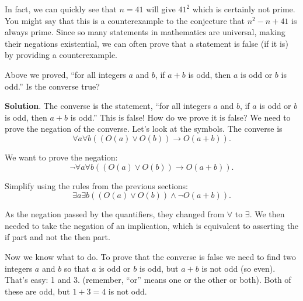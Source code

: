 \documentclass[11pt,]{book}
\theoremstyle{ptxplainnotitle}
\theoremstyle{ptxplaintitle}
\theoremstyle{ptxdefinitionnotitle}
\theoremstyle{ptxdefinitiontitle}
\theoremstyle{ptxdefinitionnotitle}
\theoremstyle{ptxdefinitiontitle}
\theoremstyle{ptxdefinitionnotitle}
\theoremstyle{ptxdefinitiontitle}
\theoremstyle{ptxdefinitiontitlenonumber}
\theoremstyle{ptxdefinitiontitlenonumber}
\numberwithin{equation}{chapter}
\newcommand{\imp}{\rightarrow}
\begin{document}
\par
\hypertarget{p-2440}{}%
In fact, we can quickly see that \(n = 41\) will give \(41^2\) which is certainly not prime. You might say that this is a counterexample to the conjecture that \(n^2 - n + 41\) is always prime. Since so many statements in mathematics are universal, making their negations existential, we can often prove that a statement is false (if it is) by providing a counterexample.%
\begin{example}\label{example-71}
\hypertarget{p-2441}{}%
Above we proved, ``for all integers \(a\) and \(b\), if \(a+b\) is odd, then \(a\) is odd or \(b\) is odd.'' Is the converse true?%
\par\smallskip%
\noindent\textbf{Solution}.\hypertarget{solution-254}{}\quad%
\hypertarget{p-2442}{}%
The converse is the statement, ``for all integers \(a\) and \(b\), if \(a\) is odd or \(b\) is odd, then \(a + b\) is odd.'' This is false! How do we prove it is false? We need to prove the negation of the converse. Let's look at the symbols. The converse is%
\begin{equation*}
\forall a \forall b ((O(a) \vee O(b)) \imp O(a+b)).
\end{equation*}
%
\par
\hypertarget{p-2443}{}%
We want to prove the negation:%
\begin{equation*}
\neg \forall a \forall b ((O(a) \vee O(b)) \imp O(a+b)).
\end{equation*}
%
\par
\hypertarget{p-2444}{}%
Simplify using the rules from the previous sections:%
\begin{equation*}
\exists a \exists b ((O(a) \vee O(b)) \wedge \neg O(a+b)).
\end{equation*}
%
\par
\hypertarget{p-2445}{}%
As the negation passed by the quantifiers, they changed from \(\forall\) to \(\exists\). We then needed to take the negation of an implication, which is equivalent to asserting the if part and not the then part.%
\par
\hypertarget{p-2446}{}%
Now we know what to do. To prove that the converse is false we need to find two integers \(a\) and \(b\) so that \(a\) is odd or \(b\) is odd, but \(a+b\) is not odd (so even). That's easy: 1 and 3. (remember, ``or'' means one or the other or both). Both of these are odd, but \(1+3 = 4\) is not odd.%
\end{example}
\typeout{************************************************}
\typeout{************************************************}
\end{document}
